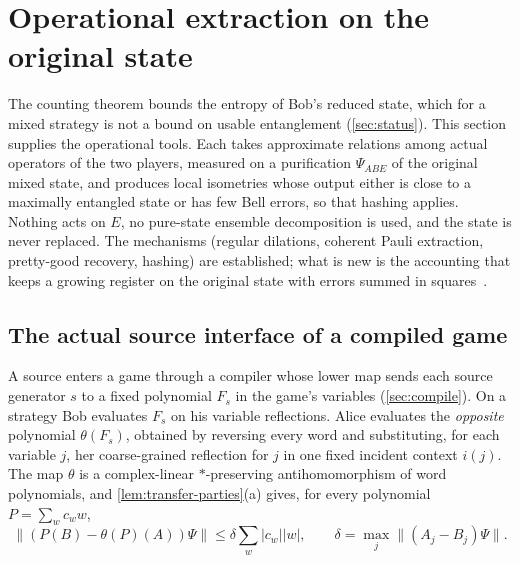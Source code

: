 \section{Operational extraction on the original state}\label{sec:extract}

The counting theorem bounds the entropy of Bob's reduced state, which for a mixed strategy is not a bound on usable entanglement
(\cref{sec:status}). This section supplies the operational tools. Each takes approximate relations among actual operators of the two players, measured on a
purification $\Psi_{ABE}$ of the original mixed state, and produces local isometries whose output either is close to a
maximally entangled state or has few Bell errors, so that hashing applies. Nothing acts on $E$, no pure-state ensemble
decomposition is used, and the state is never replaced. The mechanisms (regular dilations, coherent Pauli extraction,
pretty-good recovery, hashing) are established; what is new is the accounting that keeps a growing register on the
original state with errors summed in squares~\cite{GH17,NV17,McK16,DW05}.

\subsection{The actual source interface of a compiled game}\label{sec:interface}

A source enters a game through a compiler whose lower map sends each source generator $s$ to a fixed polynomial $F_s$ in
the game's variables (\cref{sec:compile}). On a strategy Bob evaluates $F_s$ on his variable reflections. Alice evaluates
the \emph{opposite} polynomial $\theta(F_s)$, obtained by reversing every word and substituting, for each variable $j$,
her coarse-grained reflection for $j$ in one fixed incident context $i(j)$. The map $\theta$ is a complex-linear
$*$-preserving antihomomorphism of word polynomials, and \cref{lem:transfer-parties}(a) gives, for every polynomial
$P=\sum_wc_ww$,
\begin{equation}\label{eq:opposite-poly}
\|(P(B)-\theta(P)(A))\Psi\|\le\delta\sum_w|c_w||w|,\qquad\delta=\max_j\|(A_j-B_j)\Psi\|.
\end{equation}

